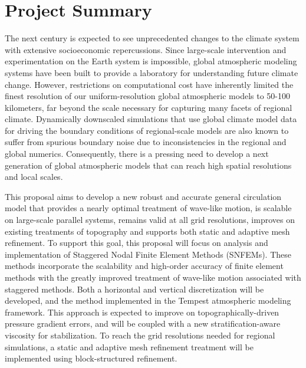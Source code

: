 \documentclass[11pt]{article}
\begin{document}
\appendix

\addtocounter{section}{1}

\section{Project Summary}
\vspace{-0.2cm}

The next century is expected to see unprecedented changes to the climate system with extensive socioeconomic repercussions.  Since large-scale intervention and experimentation on the Earth system is impossible, global atmospheric modeling systems have been built to provide a laboratory for understanding future climate change.  However, restrictions on computational cost have inherently limited the finest resolution of our uniform-resolution global atmospheric models to 50-100 kilometers, far beyond the scale necessary for capturing many facets of regional climate.  Dynamically downscaled simulations that use global climate model data for driving the boundary conditions of regional-scale models are also known to suffer from spurious boundary noise due to inconsistencies in the regional and global numerics.  Consequently, there is a pressing need to develop a next generation of global atmospheric models that can reach high spatial resolutions and local scales.

This proposal aims to develop a new robust and accurate general circulation model that provides a nearly optimal treatment of wave-like motion, is scalable on large-scale parallel systems, remains valid at all grid resolutions, improves on existing treatments of topography and supports both static and adaptive mesh refinement.  To support this goal, this proposal will focus on analysis and implementation of Staggered Nodal Finite Element Methods (SNFEMs).  These methods incorporate the scalability and high-order accuracy of finite element methods with the greatly improved treatment of wave-like motion associated with staggered methods.  Both a horizontal and vertical discretization will be developed, and the method implemented in the Tempest atmospheric modeling framework.  This approach is expected to improve on topographically-driven pressure gradient errors, and will be coupled with a new stratification-aware viscosity for stabilization.  To reach the grid resolutions needed for regional simulations, a static and adaptive mesh refinement treatment will be implemented using block-structured refinement.

\vspace{-0.5cm}
\end{document}
